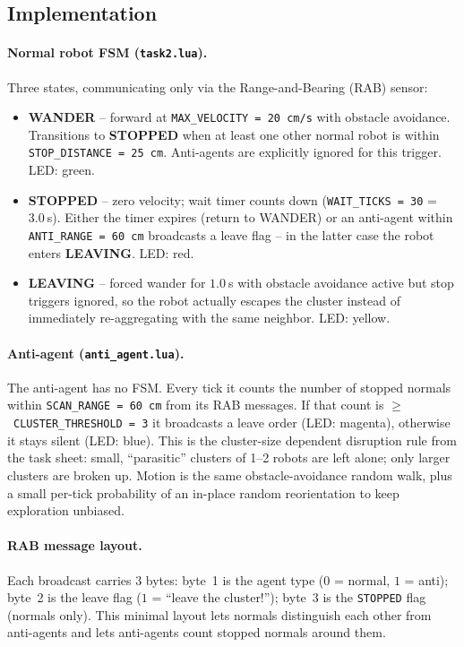\documentclass[12pt, a4paper]{article}
\begin{document}
\subsection{Implementation}

\paragraph{Normal robot FSM (\texttt{task2.lua}).}
Three states, communicating only via the Range-and-Bearing (RAB) sensor:
\begin{itemize}
    \item \textbf{WANDER} -- forward at \texttt{MAX\_VELOCITY = 20~cm/s} with
          obstacle avoidance.  Transitions to \textbf{STOPPED} when at least
          one other normal robot is within
          \texttt{STOP\_DISTANCE = 25~cm}.  Anti-agents are explicitly ignored
          for this trigger.  LED: green.
    \item \textbf{STOPPED} -- zero velocity; wait timer counts down
          (\texttt{WAIT\_TICKS = 30} = $3.0~$s).  Either the timer expires
          (return to WANDER) or an anti-agent within
          \texttt{ANTI\_RANGE = 60~cm} broadcasts a leave flag -- in the
          latter case the robot enters \textbf{LEAVING}.  LED: red.
    \item \textbf{LEAVING} -- forced wander for $1.0~$s with obstacle
          avoidance active but stop triggers ignored, so the robot actually
          escapes the cluster instead of immediately re-aggregating with the
          same neighbor.  LED: yellow.
\end{itemize}

\paragraph{Anti-agent (\texttt{anti\_agent.lua}).}
The anti-agent has no FSM.  Every tick it counts the number of stopped
normals within \texttt{SCAN\_RANGE = 60~cm} from its RAB messages.  If that
count is $\ge$~\texttt{CLUSTER\_THRESHOLD = 3} it broadcasts a leave order
(LED: magenta), otherwise it stays silent (LED: blue).  This is the
cluster-size dependent disruption rule from the task sheet: small,
``parasitic'' clusters of 1--2 robots are left alone; only larger clusters
are broken up.  Motion is the same obstacle-avoidance random walk, plus a
small per-tick probability of an in-place random reorientation to keep
exploration unbiased.

\paragraph{RAB message layout.}
Each broadcast carries 3 bytes: byte~1 is the agent type ($0$ = normal,
$1$ = anti); byte~2 is the leave flag ($1$ = ``leave the cluster!''); byte~3
is the \texttt{STOPPED} flag (normals only).  This minimal layout lets normals
distinguish each other from anti-agents and lets anti-agents count stopped
normals around them.
\end{document}
